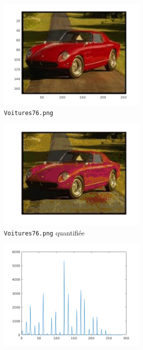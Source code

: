 \documentclass[a4paper]{article}
\begin{document}
\begin{figure}[H]
    \centering
     
    \begin{subfigure}[c]{0.46\textwidth}
        \centering
        \includegraphics[width=0.8\textwidth]{images/Voitures76.png}
        \caption{\texttt{Voitures76.png}}
    \end{subfigure}
    \begin{subfigure}[c]{0.46\textwidth}
        \centering
        \includegraphics[width=0.8\textwidth]{images/Voitures76_quantifie.png}
        \caption{\texttt{Voitures76.png} quantifiée}
    \end{subfigure}
    \begin{subfigure}[c]{0.46\textwidth}
        \centering
        \includegraphics[width=0.8\textwidth]{images/Voitures76_histo.png}

\end{subfigure}
\end{figure}
\end{document}
